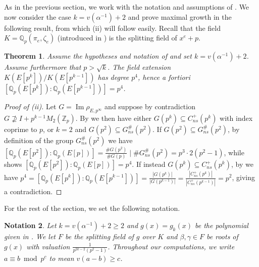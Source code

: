\documentclass{amsart}
\newtheorem{theorem}{Theorem}
\newtheorem{notation}[theorem]{Notation}
\theoremstyle{definition}
\newcommand{\Z}{\mathbb{Z}}
\newcommand{\Q}{\mathbb{Q}}
\numberwithin{theorem}{section}
\numberwithin{equation}{section}
\begin{document}
As in the previous section, we work with the notation and assumptions of .  We now consider the case $k=v(\alpha^{-1})+2$ and prove maximal growth in the following result, from which (ii) will follow easily. Recall that the field $K=\Q_p(\pi_e, \zeta_e)$ (introduced in ) is the splitting field of $x^e+p$.

\begin{theorem}\label{thm: valuation 0}
    Assume the hypotheses and notation of  and set $k=v(\alpha^{-1})+2$. Assume furthermore that $p>\sqrt{k}$.
    The field extension $K(E[p^k])/K(E[p^{k-1}])$ has degree $p^4$, hence a fortiori $[\mathbb{Q}_p(E[p^k]) : \mathbb{Q}_p(E[p^{k-1}])]=p^4$.
\end{theorem}

\begin{proof}[Proof of (ii)]
     Let $G=\operatorname{Im} \rho_{E, p^\infty}$  and suppose by contradiction $G \not \supseteq I + p^{k-1}M_2(\Z_p)$. By  we then have either $G(p^{k}) \subseteq C_{ns}^+(p^{k})$ with index coprime to $p$, or $k=2$ and $G(p^2) \subseteq G_{ns}^\#(p^2)$. 
    If $G(p^2) \subseteq G_{ns}^\#(p^2)$, by definition of the group $G_{ns}^\#(p^2)$ we have $[\Q_p(E[p^2]) : \Q_p(E[p])] =\frac{\#G(p^2)}{\#G(p)} \mid \#G_{ns}^\#(p^2)=p^3 \cdot 2(p^2-1)$, while  shows $[\mathbb{Q}_p(E[p^2]) : \mathbb{Q}_p(E[p])]=p^4$. 
    If instead $G(p^{k}) \subseteq C_{ns}^+(p^{k})$, by  we have $p^4 = [\Q_p(E[p^{k}]) : \Q_p(E[p^{k-1}])] = \frac{|G(p^{k})|}{|G(p^{k-1})|} = \frac{|C_{ns}^+(p^{k})|}{|C_{ns}^+(p^{k-1})|} = p^2$, giving a contradiction.
\end{proof}

For the rest of the section, we set the following notation.
\begin{notation}\label{alpha unit notation}
Let $k=v(\alpha^{-1})+2 \geq 2$ and $g(x)=g_k(x)$ be the polynomial given in . We let $F$ be the splitting field of $g$ over $K$ and $\beta,\gamma \in F$ be roots of $g(x)$ with valuation $\frac{1}{p^{2k-2}(p^2-1)}$. Throughout our computations, we write $a \equiv b \bmod p^c$ to mean $v(a-b) \geq c$.
\end{notation}
\end{document}
